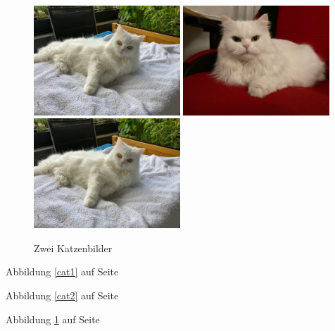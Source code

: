 \documentclass[12pt,ngerman]{scrartcl}
\begin{document}
\begin{figure}
\centering
{}
{\includegraphics[width=0.49\textwidth]{Bilder/Katze1}}
{\includegraphics[width=0.49\textwidth]{Bilder/Katze}}
{\includegraphics[width=0.49\textwidth]{Bilder/Katze1}}
\caption{Zwei Katzenbilder}\label{katzenbilder}
\end{figure}

Abbildung \ref{cat1} auf Seite \pageref{katzenbilder}

Abbildung \ref{cat2} auf Seite \pageref{katzenbilder}

Abbildung \ref{katzenbilder} auf Seite \pageref{katzenbilder}
\end{document}
